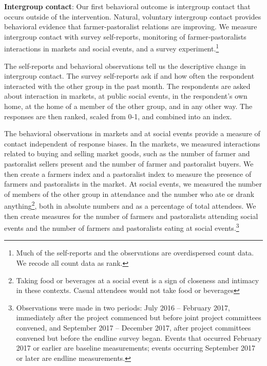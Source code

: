 \documentclass[11pt]{article}
\begin{document}
\textbf{Intergroup contact}: Our first behavioral outcome is intergroup
contact that occurs outside of the intervention. Natural, voluntary
intergroup contact provides behavioral evidence that farmer-pastoralist
relations are improving. We measure intergroup contact with survey
self-reports, monitoring of farmer-pastoralists interactions in markets
and social events, and a survey experiment.\footnote{Much of the
  self-reports and the observations are overdispersed count data. We
  recode all count data as rank.}

The self-reports and behavioral observations tell us the descriptive
change in intergroup contact. The survey self-reports ask if and how
often the respondent interacted with the other group in the past month.
The respondents are asked about interaction in markets, at public social
events, in the respondent's own home, at the home of a member of the
other group, and in any other way. The responses are then ranked, scaled
from 0-1, and combined into an index.

The behavioral observations in markets and at social events provide a
measure of contact independent of response biases. In the markets, we
measured interactions related to buying and selling market goods, such
as the number of farmer and pastoralist sellers present and the number
of farmer and pastoralist buyers. We then create a farmers index and a
pastoralist index to measure the presence of farmers and pastoralists in
the market. At social events, we measured the number of members of the
other group in attendance and the number who ate or drank
anything\footnote{Taking food or beverages at a social event is a sign
  of closeness and intimacy in these contexts. Casual attendees would
  not take food or beverages}, both in absolute numbers and as a
percentage of total attendees. We then create measures for the number of
farmers and pastoralists attending social events and the number of
farmers and pastoralists eating at social events.\footnote{Observations
  were made in two periods: July 2016 -- February 2017, immediately
  after the project commenced but before joint project committees
  convened, and September 2017 -- December 2017, after project
  committees convened but before the endline survey began. Events that
  occurred February 2017 or earlier are baseline measurements; events
  occurring September 2017 or later are endline measurements.}
\end{document}
